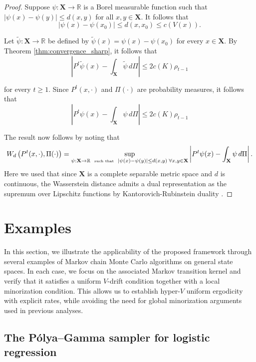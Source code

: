 \documentclass[ejsv2, noshowframe]{imsart}
\theoremstyle{plain}
\theoremstyle{definition}
\theoremstyle{remark}
\newcommand{\X}{\textbf{X}}
\begin{document}
\begin{proof}
    Suppose $\psi: \X \to \mathbb{R}$ is a Borel measurable function such that $|\psi(x) - \psi(y)| \leq d(x,y)$ for all $x,y \in \X$. It follows that 
    $$
    |\psi(x) - \psi(x_0)| \leq d(x,x_0) \leq c(V(x)). 
    $$

    \noindent
    Let $\tilde{\psi}: \X \to \mathbb{R}$ be defined by $\tilde{\psi}(x) = \psi(x) - \psi(x_0)$ for every $x \in \X$. By Theorem \ref{thm:convergence_sharp}, it follows that 
$$
\left|
P^{t} \tilde{\psi}(x) - \int_{\X} \tilde{\psi} \, d\Pi
\right|
\le 2 c(K) \rho_{t-1} 
$$

\noindent
for every $t \geq 1$. Since $P^{t}(x, \cdot)$ and $\Pi(\cdot)$ are probability measures, it follows that 
$$
\left|
P^{t} {\psi}(x) - \int_{\X} \psi \, d\Pi
\right|
\le 2 c(K) \rho_{t-1}
$$

\noindent
The result now follows by noting that 
$$
W_d \left( P^{t}(x, \cdot), \Pi(\cdot) \right) = \sup_{\psi: \X \to \mathbb{R} {\mbox{ \small{\tiny{ such that} } } } |\psi(x) - \psi(y)| \leq d(x,y) \; \forall x,y \in \X} \left|
P^{t} {\psi}(x) - \int_{\X} \psi \, d\Pi
\right|. 
$$
Here we used that since $\X$ is a complete separable metric space and $d$ is continuous, the Wasserstein distance admits a dual representation as the supremum over Lipschitz functions by Kantorovich-Rubinstein duality \citep{kantorovich:rubinshtein:1958, villani:2008}.
\end{proof}


\section{Examples}
\label{section:examples}

\noindent
In this section, we illustrate the applicability of the proposed framework through several examples of Markov chain Monte Carlo algorithms on general state spaces. In each case, we focus on the associated Markov transition kernel and verify that it satisfies a uniform $V$-drift condition together with a local minorization condition. This allows us to establish hyper-$V$ uniform ergodicity with explicit rates, while avoiding the need for global minorization arguments used in previous analyses.

\subsection{The P\'olya--Gamma sampler for logistic regression} \label{example:pg_sampler}
\end{document}

